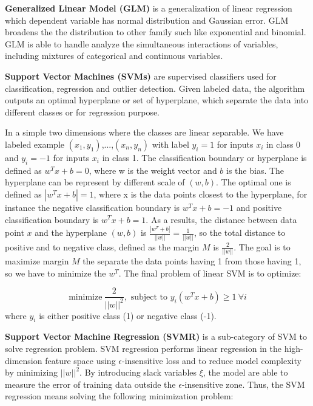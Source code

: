 \documentclass[12pt,english]{report}
\begin{document}
\textbf{Generalized Linear Model (GLM)} is a generalization of linear
regression which dependent variable has normal distribution and Gaussian error.
GLM broadens the the distribution to other family such like exponential and
binomial.  GLM is able to handle analyze the simultaneous interactions of
variables, including mixtures of categorical and continuous variables.

\textbf{ Support Vector Machines (SVMs)} are supervised classifiers used for
classification, regression and outlier detection. Given labeled data, the
algorithm outputs an optimal hyperplane or set of hyperplane, which separate
the data into different classes or for regression purpose.

In a simple two dimensions where the classes are linear separable. We have
labeled example $(x_1,y_1)$,...,$(x_n, y_n)$ with label $y_i = 1$ for inputs
$x_i$ in class 0 and $y_i = -1$ for inputs $x_i$ in class 1. The classification
boundary or hyperplane is defined as $w^T x +b = 0$, where w is the weight
vector and $b$ is the bias. The hyperplane can be represent by
different scale of $(w,b)$. The optimal one is defined as
$|w^T x +b | = 1$, where x is the data points closest to the hyperplane, for
instance the negative classification boundary is $w^T x +b = -1$ and positive
classification boundary is $w^T x +b  = 1$. As a results, the distance between
data point $x$ and the hyperplane $(w,b)$ is $ \frac{|w^T+b|}{||w||}=
\frac{1}{||w||}$, so the total distance to positive and to negative class,
defined as the margin $M$ is $\frac{2}{||w||}$.  The goal is to maximize margin
$M$ the separate the data points having 1 from those having 1, so we have to
minimize the $w^T$. The final problem of linear SVM is to optimize:

\begin{equation}
\text{minimize} \ \frac{2}{||w||^2},
\text{ subject to }
y_{i}(w^T x +b) \geq 1 \ \forall i
\end{equation}
where $y_i$ is either positive class (1) or negative class (-1).

\textbf{Support Vector Machine Regression (SVMR)} is a sub-category of SVM to
solve regression problem. 
SVM regression performs linear regression in the high-dimension feature space
using  $\epsilon$-insensitive loss and to reduce model complexity by
minimizing $||w||^2$. By introducing slack variables $\xi$, the model are able
to measure the error of training data outside the $\epsilon$-insensitive zone.
Thus, the SVM regression means solving the following minimization problem: 
\end{document}
